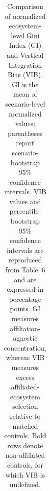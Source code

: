 \begin{table}[t]
{\begin{tabular}{llcc|cc}
\bottomrule
\end{tabular}%
}
\caption{Comparison of normalized ecosystem-level Gini Index (GI) and Vertical Integration Bias (VIB). GI is the mean of scenario-level normalized values; parentheses report scenario-bootstrap 95\% confidence intervals. VIB values and percentile-bootstrap 95\% confidence intervals are reproduced from Table~6 and are expressed in percentage points. GI measures affiliation-agnostic concentration, whereas VIB measures excess affiliated-ecosystem selection relative to matched controls. Bold rows denote non-affiliated controls, for which VIB is undefined.}
\label{tab:gini-vib-comparison}
\end{table}
